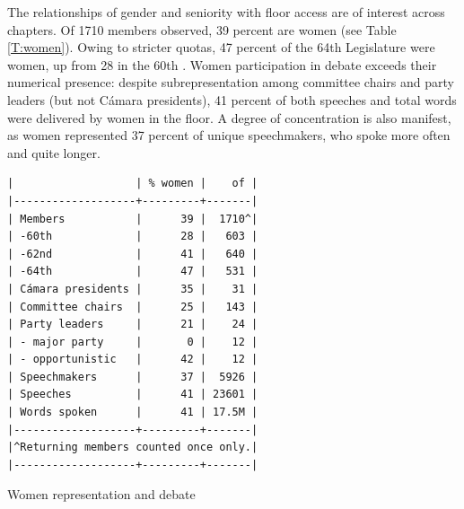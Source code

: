 \documentclass[letter,12pt]{article}
\begin{document}




  The relationships of gender and seniority with floor access are of interest across chapters. Of 1710 members observed, 39 percent are women (see Table \ref{T:women}). Owing to stricter quotas, 47 percent of the 64th Legislature were women, up from 28 in the 60th \citep{piscopo.2016}. Women participation in debate exceeds their numerical presence: despite subrepresentation among committee chairs and party leaders (but not Cámara presidents), 41 percent of both speeches and total words were delivered by women in the floor. A degree of concentration is also manifest, as women represented 37 percent of unique speechmakers, who  spoke more often and quite longer. 

\begin{table}
  \begin{scriptsize}
    \begin{verbatim}
|                   | % women |    of |
|-------------------+---------+-------|
| Members           |      39 |  1710^|
| -60th             |      28 |   603 |
| -62nd             |      41 |   640 |
| -64th             |      47 |   531 |
| Cámara presidents |      35 |    31 |
| Committee chairs  |      25 |   143 |
| Party leaders     |      21 |    24 |
| - major party     |       0 |    12 |
| - opportunistic   |      42 |    12 |
| Speechmakers      |      37 |  5926 |
| Speeches          |      41 | 23601 |
| Words spoken      |      41 | 17.5M |
|-------------------+---------+-------|
|^Returning members counted once only.|
|-------------------+---------+-------|
    \end{verbatim}
  \end{scriptsize}
\caption{Women representation and debate}\label{T:women}
\end{table}
\end{document}
